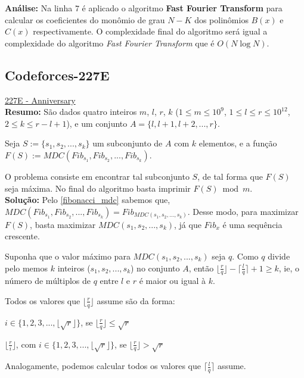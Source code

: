 \textbf{Análise:}
Na linha $7$ é aplicado o algoritmo \textbf{Fast Fourier Transform} para calcular os coeficientes do monômio de grau $N-K$ dos 
polinômios $B(x)$ e $C(x)$ respectivamente. O complexidade final do algoritmo será igual a complexidade do algoritmo \textit{Fast Fourier Transform} que é $O(N\log N)$.



\subsection{Codeforces-227E}
\href{http://codeforces.com/contest/227/problem/E}{227E - Anniversary}\\

\textbf{Resumo:}
São dados quatro inteiros $m$, $l$, $r$, $k$ ($1\leq m\leq 10^9$, $1\leq l \leq r \leq 10^{12}$, $2\leq k\leq r-l+1$), 
e um conjunto $A = \{l,l+1,l+2,...,r\}$.

Seja $S := \{s_1, s_2,...,s_k\}$ um subconjunto de $A$ com $k$ elementos, e a função  $F(S) := MDC(Fib_{s_1}, Fib_{s_2}, ..., Fib_{s_k})$.

O problema consiste em encontrar tal subconjunto $S$, de tal forma que $F(S)$ seja máxima. No final do algoritmo basta imprimir 
$F(S) \bmod m$.
\\

\textbf{Solução:}
Pelo \autoref{fibonacci_mdc} sabemos que, $MDC(Fib_{s_1}, Fib_{s_2}, ..., Fib_{s_k}) = Fib_{MDC(s_1,s_2,...,s_k)}$.
Desse modo, para maximizar $F(S)$, basta maximizar $MDC(s_1,s_2,...,s_k)$, já que $Fib_x$ é uma sequência crescente.

Suponha que o valor máximo para $MDC(s_1,s_2,...,s_k)$ seja $q$. Como $q$ divide pelo memos $k$ inteiros ($s_1,s_2,...,s_k$)
no conjunto $A$, então $\lfloor \frac{r}{q} \rfloor -\lceil \frac{l}{q} \rceil + 1 \geq k$, ie, o número de múltiplos de $q$ entre $l$ e $r$ é maior ou igual à $k$.

Todos os valores que $\lfloor \frac{r}{q} \rfloor$ assume são da forma:
\newline

$i \in \{1,2,3,...,\lfloor\sqrt{r}\rfloor\}$, se $\lfloor \frac{r}{q} \rfloor \leq \sqrt{r}$

$\lfloor \frac{r}{i} \rfloor$, com $i \in \{1,2,3,...,\lfloor\sqrt{r}\rfloor\}$, se $\lfloor \frac{r}{q} \rfloor > \sqrt{r}$
\newline

Analogamente, podemos calcular todos os valores que $\lceil \frac{l}{q} \rceil$ assume.

